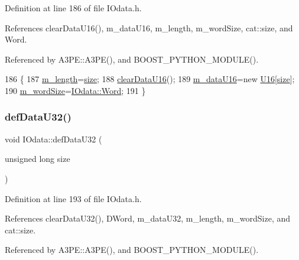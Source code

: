 Definition at line 186 of file I\+Odata.\+h.



References clear\+Data\+U16(), m\+\_\+data\+U16, m\+\_\+length, m\+\_\+word\+Size, cat\+::size, and Word.



Referenced by A3\+P\+E\+::\+A3\+P\+E(), and B\+O\+O\+S\+T\+\_\+\+P\+Y\+T\+H\+O\+N\+\_\+\+M\+O\+D\+U\+L\+E().


\begin{DoxyCode}
186                                      \{
187     \hyperlink{classIOdata_afabe57441da019eb614d277799106aac}{m\_length}=\hyperlink{namespacecat_a3eae50bb86a614752045105e00365a46}{size};
188     \hyperlink{classIOdata_a13016f489aba6e80cd7be53224c3e8ab}{clearDataU16}();
189     \hyperlink{classIOdata_a8d698e077b7898009691b9086a3e6453}{m\_dataU16}=\textcolor{keyword}{new} \hyperlink{ICECALv3_8h_adf928e51a60dba0df29d615401cc55a8}{U16}[\hyperlink{namespacecat_a3eae50bb86a614752045105e00365a46}{size}];
190     \hyperlink{classIOdata_a719b0ce607ada4fa91b12d6ecfa1b4c9}{m\_wordSize}=\hyperlink{classIOdata_a37c53ebf4bf8d866aac8af572962a84ca7d603e9c9a55e3c8dffa4bd8e3dca491}{IOdata::Word};
191   \}
\end{DoxyCode}
\mbox{\label{classIOdata_a78e50aa4a6c967cba195e77fe911a8c3}} 
\subsubsection{\texorpdfstring{def\+Data\+U32()}{defDataU32()}}
{\footnotesize\ttfamily void I\+Odata\+::def\+Data\+U32 (\begin{DoxyParamCaption}\item[{unsigned long}]{size }\end{DoxyParamCaption})\hspace{0.3cm}{\ttfamily [inline]}}



Definition at line 193 of file I\+Odata.\+h.



References clear\+Data\+U32(), D\+Word, m\+\_\+data\+U32, m\+\_\+length, m\+\_\+word\+Size, and cat\+::size.



Referenced by A3\+P\+E\+::\+A3\+P\+E(), and B\+O\+O\+S\+T\+\_\+\+P\+Y\+T\+H\+O\+N\+\_\+\+M\+O\+D\+U\+L\+E().


